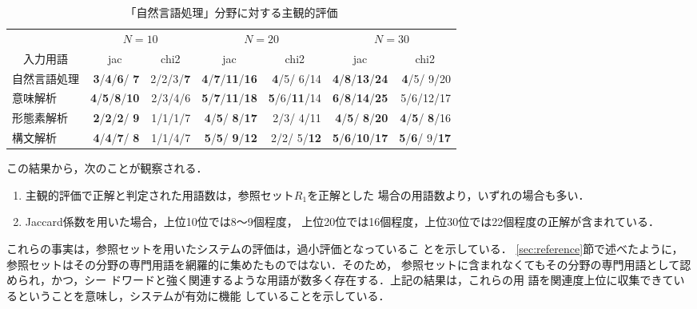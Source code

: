 \begin{table}
 \begin{center}\scriptsize
  \caption{「自然言語処理」分野に対する主観的評価}\label{tbl:subjective_evl}
  \begin{tabular}{|l||rr|rr|rr|}
   \hline
   \multicolumn{1}{|c||}{} &
   \multicolumn{2}{c}{$N=10$} & 
   \multicolumn{2}{|c}{$N=20$} &
   \multicolumn{2}{|c|}{$N=30$} \\
   \multicolumn{1}{|c||}{入力用語} & 
   \multicolumn{1}{c}{jac} &
   \multicolumn{1}{c}{chi2} &
   \multicolumn{1}{|c}{jac} &
   \multicolumn{1}{c}{chi2} &
   \multicolumn{1}{|c}{jac} &
   \multicolumn{1}{c|}{chi2} \\
   \hline
   自然言語処理 & {\bf 3}/{\bf 4}/{\bf 6}/ {\bf 7} & 2/2/3/{\bf 7} & {\bf 4}/{\bf 7}/{\bf 11}/{\bf 16} & {\bf 4}/5/ 6/14 & {\bf 4}/{\bf 8}/{\bf 13}/{\bf 24} & {\bf 4}/5/ 9/20 \\
   意味解析 & {\bf 4}/{\bf 5}/{\bf 8}/{\bf 10} & 2/3/4/6 & {\bf 5}/{\bf 7}/{\bf 11}/{\bf 18} & {\bf 5}/6/{\bf 11}/14 & {\bf 6}/{\bf 8}/{\bf 14}/{\bf 25} &  5/6/12/17 \\
   形態素解析 & {\bf 2}/{\bf 2}/{\bf 2}/ {\bf 9} & 1/1/1/7 & {\bf 4}/{\bf 5}/ {\bf 8}/{\bf 17} & 2/3/ 4/11 & {\bf 4}/{\bf 5}/ {\bf 8}/{\bf 20} & {\bf 4}/{\bf 5}/ {\bf 8}/16 \\
   構文解析 & {\bf 4}/{\bf 4}/{\bf 7}/ {\bf 8} & 1/1/4/7 & {\bf 5}/{\bf 5}/ {\bf 9}/{\bf 12} & 2/2/ 5/{\bf 12} & {\bf 5}/{\bf 6}/{\bf 10}/{\bf 17} & {\bf 5}/{\bf 6}/ 9/{\bf 17} \\
   \hline
  \end{tabular}
 \end{center}
\end{table}

この結果から，次のことが観察される．
\begin{enumerate}
\item
主観的評価で正解と判定された用語数は，参照セット$R_1$を正解とした
場合の用語数より，いずれの場合も多い．
\item
Jaccard係数を用いた場合，上位10位では8〜9個程度，
上位20位では16個程度，上位30位では22個程度の正解が含まれている．
\end{enumerate}

これらの事実は，参照セットを用いたシステムの評価は，過小評価となっているこ
とを示している．
\mbox{\ref{sec:reference}節}で述べたように，
参照セットはその分野の専門用語を網羅的に集めたものではない．そのため，
参照セットに含まれなくてもその分野の専門用語として認められ，かつ，シー
ドワードと強く関連するような用語が数多く存在する．上記の結果は，これらの用
語を関連度上位に収集できているということを意味し，システムが有効に機能
していることを示している．

